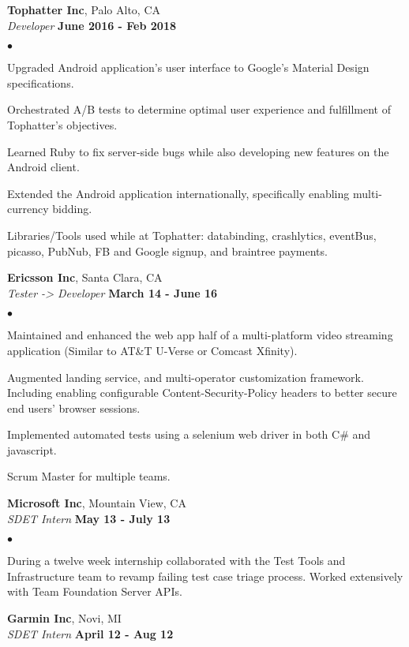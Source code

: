 \documentclass[margin,line]{res}
\newenvironment{list2}{
  \begin{list}{$\bullet$}{
      \setlength{\itemsep}{0in}
      \setlength{\parsep}{0in} \setlength{\parskip}{0in}
      \setlength{\topsep}{0in} \setlength{\partopsep}{0in} 
      \setlength{\leftmargin}{0.2in}}}{\end{list}}
\begin{document}
\begin{resume}
  {\bf Tophatter Inc}, Palo Alto, CA\\
  {\em Developer} \hfill {\bf June 2016 - Feb 2018}

\begin{list2}
  \item  Upgraded Android application’s user interface to Google’s Material Design specifications.
  \item  Orchestrated A/B tests to determine optimal user experience and fulfillment of Tophatter’s objectives.
  \item  Learned Ruby to fix server-side bugs while also developing new features on the Android client.
  \item  Extended the Android application internationally, specifically enabling multi-currency bidding.
  \item  Libraries/Tools used while at Tophatter: databinding, crashlytics, eventBus, picasso, PubNub, FB and Google signup, and braintree payments.
\end{list2}

  {\bf Ericsson Inc}, Santa Clara, CA\\
  {\em Tester -> Developer} \hfill {\bf March 14 - June 16}

\begin{list2}
  \item Maintained and enhanced the web app half of a multi-platform video streaming application (Similar to AT\&T U-Verse or Comcast Xfinity).
  \item Augmented landing service, and multi-operator customization framework. Including enabling configurable Content-Security-Policy headers to better secure end users’ browser sessions.
  \item Implemented automated tests using a selenium web driver in both C\# and javascript.
  \item Scrum Master for multiple teams.
\end{list2}

  {\bf Microsoft Inc}, Mountain View, CA\\
  {\em SDET Intern} \hfill {\bf May 13 - July 13}

\begin{list2}
  \item During a twelve week internship collaborated with the Test Tools and Infrastructure team to revamp failing test case triage process. Worked extensively with Team Foundation Server APIs.
\end{list2}

  {\bf Garmin Inc}, Novi, MI\\
  {\em SDET Intern} \hfill {\bf April 12 - Aug 12}


\end{resume}
\end{document}
